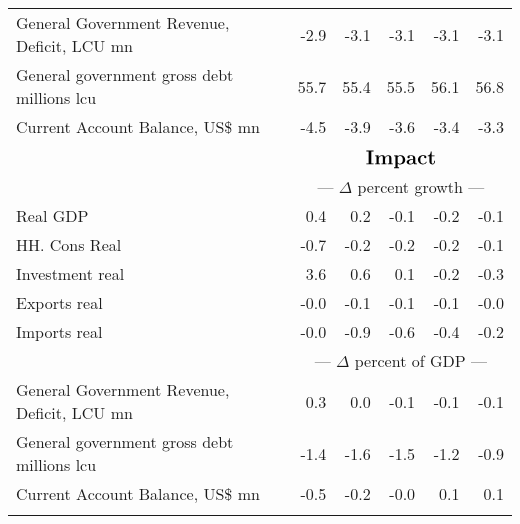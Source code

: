 \documentclass{article}
\begin{document}
\begin{table}[ht]
\begin{tabular}{lrrrrr}
General Government Revenue, Deficit, LCU mn & -2.9 & -3.1 & -3.1 & -3.1 & -3.1 \\
General government gross debt millions lcu & 55.7 & 55.4 & 55.5 & 56.1 & 56.8 \\
Current Account Balance, US\$ mn & -4.5 & -3.9 & -3.6 & -3.4 & -3.3 \\
&\multicolumn{5}{c}{{ }}                                                                                                     \\
&\multicolumn{5}{c}{{$\Large \textbf{Impact}$}}                                                                                                     \\
&\multicolumn{5}{c}{{--- $\Delta$  percent growth ---}}                                                                                                     \\
Real GDP & 0.4 & 0.2 & -0.1 & -0.2 & -0.1 \\
HH. Cons Real & -0.7 & -0.2 & -0.2 & -0.2 & -0.1 \\
Investment real & 3.6 & 0.6 & 0.1 & -0.2 & -0.3 \\
Exports real & -0.0 & -0.1 & -0.1 & -0.1 & -0.0 \\
Imports real & -0.0 & -0.9 & -0.6 & -0.4 & -0.2 \\
&\multicolumn{5}{c}{{--- $\Delta$  percent of GDP ---}}                                                                                                     \\
General Government Revenue, Deficit, LCU mn & 0.3 & 0.0 & -0.1 & -0.1 & -0.1 \\
General government gross debt millions lcu & -1.4 & -1.6 & -1.5 & -1.2 & -0.9 \\
Current Account Balance, US\$ mn & -0.5 & -0.2 & -0.0 & 0.1 & 0.1 \\
&\multicolumn{5}{c}{{ }}                                                                                                     \\
\bottomrule
\end{tabular}
\end{table}
\end{document}
